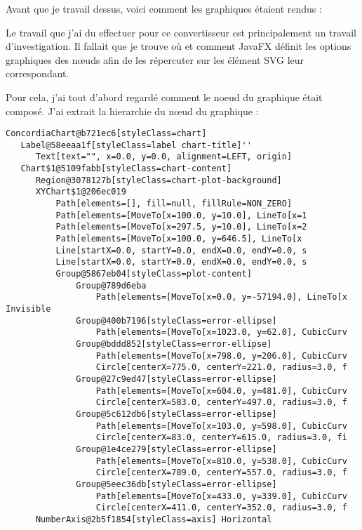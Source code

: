 Avant que je travail dessus, voici comment les graphiques étaient rendus :

Le travail que j'ai du effectuer pour ce convertisseur est principalement un travail d'investigation. Il fallait que je trouve où et comment JavaFX définit les options graphiques des nœuds afin de les répercuter sur les élément SVG leur correspondant.

Pour cela, j'ai tout d'abord regardé comment le noeud du graphique était composé. J'ai extrait la hierarchie du nœud du graphique :

\begin{verbatim}
ConcordiaChart@b721ec6[styleClass=chart]
   Label@58eeaa1f[styleClass=label chart-title]''
      Text[text="", x=0.0, y=0.0, alignment=LEFT, origin]
   Chart$1@5109fabb[styleClass=chart-content]
      Region@3078127b[styleClass=chart-plot-background]
      XYChart$1@206ec019
          Path[elements=[], fill=null, fillRule=NON_ZERO]
          Path[elements=[MoveTo[x=100.0, y=10.0], LineTo[x=1 
          Path[elements=[MoveTo[x=297.5, y=10.0], LineTo[x=2
          Path[elements=[MoveTo[x=100.0, y=646.5], LineTo[x 
          Line[startX=0.0, startY=0.0, endX=0.0, endY=0.0, s 
          Line[startX=0.0, startY=0.0, endX=0.0, endY=0.0, s
          Group@5867eb04[styleClass=plot-content]
              Group@789d6eba
                  Path[elements=[MoveTo[x=0.0, y=-57194.0], LineTo[x Invisible
              Group@400b7196[styleClass=error-ellipse]
                  Path[elements=[MoveTo[x=1023.0, y=62.0], CubicCurv
              Group@bddd852[styleClass=error-ellipse]
                  Path[elements=[MoveTo[x=798.0, y=206.0], CubicCurv
                  Circle[centerX=775.0, centerY=221.0, radius=3.0, f
              Group@27c9ed47[styleClass=error-ellipse]
                  Path[elements=[MoveTo[x=604.0, y=481.0], CubicCurv
                  Circle[centerX=583.0, centerY=497.0, radius=3.0, f
              Group@5c612db6[styleClass=error-ellipse]
                  Path[elements=[MoveTo[x=103.0, y=598.0], CubicCurv
                  Circle[centerX=83.0, centerY=615.0, radius=3.0, fi
              Group@1e4ce279[styleClass=error-ellipse]
                  Path[elements=[MoveTo[x=810.0, y=538.0], CubicCurv
                  Circle[centerX=789.0, centerY=557.0, radius=3.0, f
              Group@5eec36db[styleClass=error-ellipse]
                  Path[elements=[MoveTo[x=433.0, y=339.0], CubicCurv
                  Circle[centerX=411.0, centerY=352.0, radius=3.0, f
      NumberAxis@2b5f1854[styleClass=axis] Horizontal 

\end{verbatim}
